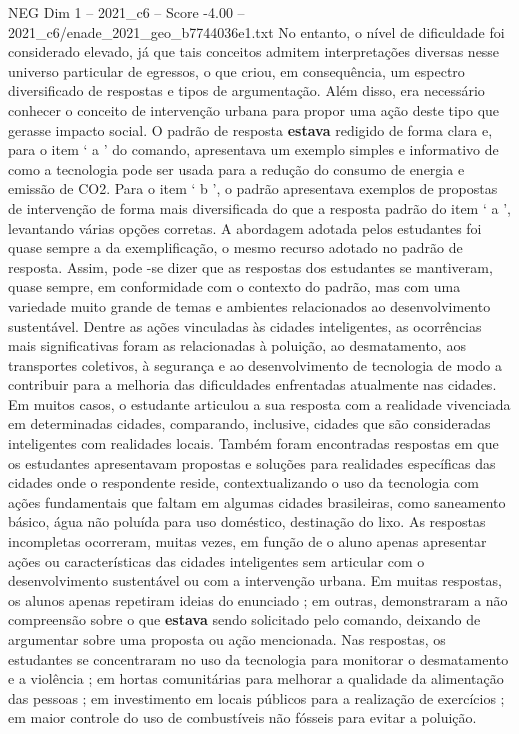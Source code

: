 \begin{textsample}{NEG Dim 1 – 2021\_c6 – Score -4.00 – 2021\_c6/enade\_2021\_geo\_b7744036e1.txt}
No entanto, o nível de dificuldade foi considerado elevado, já que tais conceitos admitem interpretações diversas nesse universo particular de egressos, o que criou, em consequência, um espectro diversificado de respostas e tipos de argumentação.
Além disso, era necessário conhecer o conceito de intervenção urbana para propor uma ação deste tipo que gerasse impacto social.
O padrão de resposta \textbf{estava} redigido de forma clara e, para o item ‘ a ’ do comando, apresentava um exemplo simples e informativo de como a tecnologia pode ser usada para a redução do consumo de energia e emissão de CO2.
Para o item ‘ b ’, o padrão apresentava exemplos de propostas de intervenção de forma mais diversificada do que a resposta padrão do item ‘ a ’, levantando várias opções corretas.
A abordagem adotada pelos estudantes foi quase sempre a da exemplificação, o mesmo recurso adotado no padrão de resposta.
Assim, pode -se dizer que as respostas dos estudantes se mantiveram, quase sempre, em conformidade com o contexto do padrão, mas com uma variedade muito grande de temas e ambientes relacionados ao desenvolvimento sustentável.
Dentre as ações vinculadas às cidades inteligentes, as ocorrências mais significativas foram as relacionadas à poluição, ao desmatamento, aos transportes coletivos, à segurança e ao desenvolvimento de tecnologia de modo a contribuir para a melhoria das dificuldades enfrentadas atualmente nas cidades.
Em muitos casos, o estudante articulou a sua resposta com a realidade vivenciada em determinadas cidades, comparando, inclusive, cidades que são consideradas inteligentes com realidades locais.
Também foram encontradas respostas em que os estudantes apresentavam propostas e soluções para realidades específicas das cidades onde o respondente reside, contextualizando o uso da tecnologia com ações fundamentais que faltam em algumas cidades brasileiras, como saneamento básico, água não poluída para uso doméstico, destinação do lixo.
As respostas incompletas ocorreram, muitas vezes, em função de o aluno apenas apresentar ações ou características das cidades inteligentes sem articular com o desenvolvimento sustentável ou com a intervenção urbana.
Em muitas respostas, os alunos apenas repetiram ideias do enunciado ; em outras, demonstraram a não compreensão sobre o que \textbf{estava} sendo solicitado pelo comando, deixando de argumentar sobre uma proposta ou ação mencionada.
Nas respostas, os estudantes se concentraram no uso da tecnologia para monitorar o desmatamento e a violência ; em hortas comunitárias para melhorar a qualidade da alimentação das pessoas ; em investimento em locais públicos para a realização de exercícios ; em maior controle do uso de combustíveis não fósseis para evitar a poluição.

\end{textsample}
